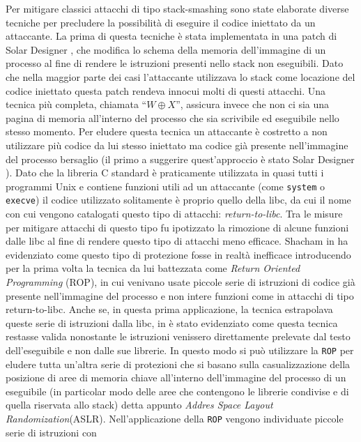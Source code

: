 Per mitigare classici attacchi di tipo stack-smashing sono state
elaborate diverse tecniche per precludere la possibilità di eseguire
il codice iniettato da un attaccante. La prima di questa tecniche è
stata implementata in una patch di Solar Designer \cite{stackpatch},
che modifica lo schema della memoria dell'immagine di un processo al
fine di rendere le istruzioni presenti nello stack non eseguibili. Dato
che nella maggior parte dei casi l'attaccante utilizzava lo stack come
locazione del codice iniettato questa patch rendeva innocui molti di
questi attacchi. Una tecnica più completa, chiamata ``$W \oplus X$'',
assicura invece che non ci sia una pagina di memoria all'interno del
processo che sia scrivibile ed eseguibile nello stesso momento. Per
eludere questa tecnica un attaccante è costretto a non utilizzare più
codice da lui stesso iniettato ma codice già presente nell'immagine
del processo bersaglio (il primo a suggerire quest'approccio è stato
Solar Designer \cite{solar-return-to-libc}). Dato che la libreria C
standard è praticamente utilizzata in quasi tutti i programmi Unix e
contiene funzioni utili ad un attaccante (come \lstinline{system} o
\lstinline{execve}) il codice utilizzato solitamente è proprio quello
della libc, da cui il nome con cui vengono catalogati questo tipo di
attacchi: \emph{return-to-libc}. Tra le misure per mitigare attacchi
di questo tipo fu ipotizzato la rimozione di alcune funzioni dalle
libc al fine di rendere questo tipo di attacchi meno efficace. Shacham
in \cite{Shacham-2007} ha evidenziato come questo tipo di protezione
fosse in realtà inefficace introducendo per la prima volta la tecnica
da lui battezzata come \emph{Return Oriented Programming} (ROP), in
cui venivano usate piccole serie di istruzioni di codice già presente
nell'immagine del processo e non intere funzioni come in attacchi di
tipo return-to-libc. Anche se, in questa prima applicazione, la
tecnica estrapolava queste serie di istruzioni dalla libc, in
\cite{schwartz-2011} è stato evidenziato come questa tecnica restasse valida
nonostante le istruzioni venissero direttamente prelevate dal testo
dell'eseguibile e non dalle sue librerie. In questo modo si può
utilizzare la \lstinline{ROP} per eludere tutta un'altra serie di
protezioni che si basano sulla casualizzazione della posizione di aree
di memoria chiave all'interno dell'immagine del processo di un
eseguibile (in particolar modo delle aree che contengono le librerie
condivise e di quella riservata allo stack) detta appunto \emph{Addres
  Space Layout Randomization}(ASLR). Nell'applicazione della
\lstinline{ROP} vengono individuate piccole serie di istruzioni con
